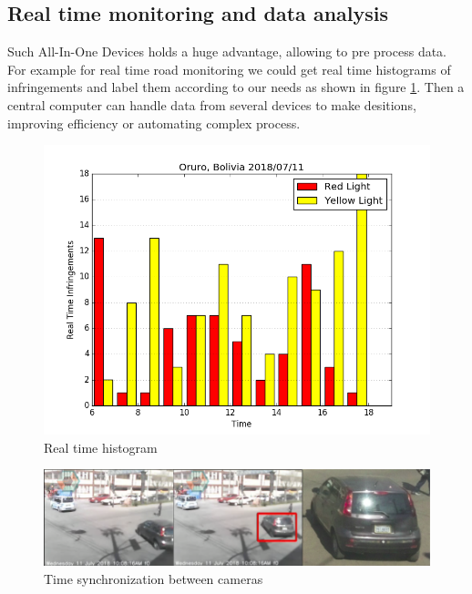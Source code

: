 \documentclass[fleqn,12pt]{SelfArx} %
\begin{document}
\subsection{Real time monitoring and data analysis}

Such All-In-One Devices holds a huge advantage, allowing to pre process data. For example for real time road monitoring we could get real time histograms of infringements and label them according to our needs as shown in figure \ref{fig:histogram}. Then a central computer can handle data from several devices to make desitions, improving efficiency or automating complex process.

\begin{figure}[ht]\centering
	\includegraphics[width=\linewidth]{images/histogram}
	\caption{Real time histogram}
	\label{fig:histogram}
\end{figure}

\begin{figure}[ht]\centering %
	\includegraphics[width=\linewidth]{images/sync}
	\caption{Time synchronization between cameras}
	\label{fig:sync}
\end{figure}
\end{document}
